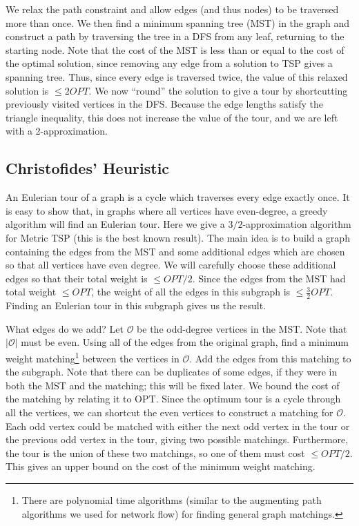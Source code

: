 \documentclass{article}
\begin{document}
We relax the path constraint and allow edges (and thus nodes) to be
traversed more than once. We then find a minimum spanning tree (MST)
in the graph and construct a path by traversing the tree in a DFS from
any leaf, returning to the starting node. Note that the cost of the
MST is less than or equal to the cost of the optimal solution, since
removing any edge from a solution to TSP gives a spanning tree. Thus,
since every edge is traversed twice, the value of this relaxed
solution is $\le 2OPT$. We now ``round'' the solution to give a tour by
shortcutting previously visited vertices in the DFS. Because the
edge lengths satisfy the triangle inequality, this does not increase
the value of the tour, and we are left with a 2-approximation.

\subsection{Christofides' Heuristic}

An Eulerian tour of a graph is a cycle which traverses every edge
exactly once. It is easy to show that, in graphs where all vertices
have even-degree, a greedy algorithm will find an Eulerian tour. Here
we give a $3/2$-approximation algorithm for Metric TSP (this is the
best known result). The main idea is to build a graph containing the
edges from the MST and some additional edges which are chosen so that
all vertices have even degree. We will carefully choose these
additional edges so that their total weight is $\le OPT/2$. Since the
edges from the MST had total weight $\le OPT$, the weight of all the
edges in this subgraph is $\le \frac{3}{2}OPT$. Finding an Eulerian
tour in this subgraph gives us the result.

What edges do we add? Let $\mathcal{O}$ be the odd-degree vertices in
the MST. Note that $|\mathcal{O}|$ must be even. Using all of the
edges from the original graph, find a minimum weight
matching\footnote{There are polynomial time algorithms (similar to the
augmenting path algorithms we used for network flow) for finding
general graph matchings.} between the vertices in $\mathcal{O}$. Add
the edges from this matching to the subgraph. Note that there can be
duplicates of some edges, if they were in both the MST and the
matching; this will be fixed later. We bound the cost of the matching
by relating it to OPT. Since the optimum tour is a cycle through all
the vertices, we can shortcut the even vertices to construct a
matching for $\mathcal{O}$. Each odd vertex could be matched
with either the next odd vertex in the tour or the previous odd vertex
in the tour, giving two possible matchings. Furthermore, the
tour is the union of these two matchings, so one of them must cost $\le
OPT/2$. This gives an upper bound on the cost of the minimum weight
matching.
\end{document}
